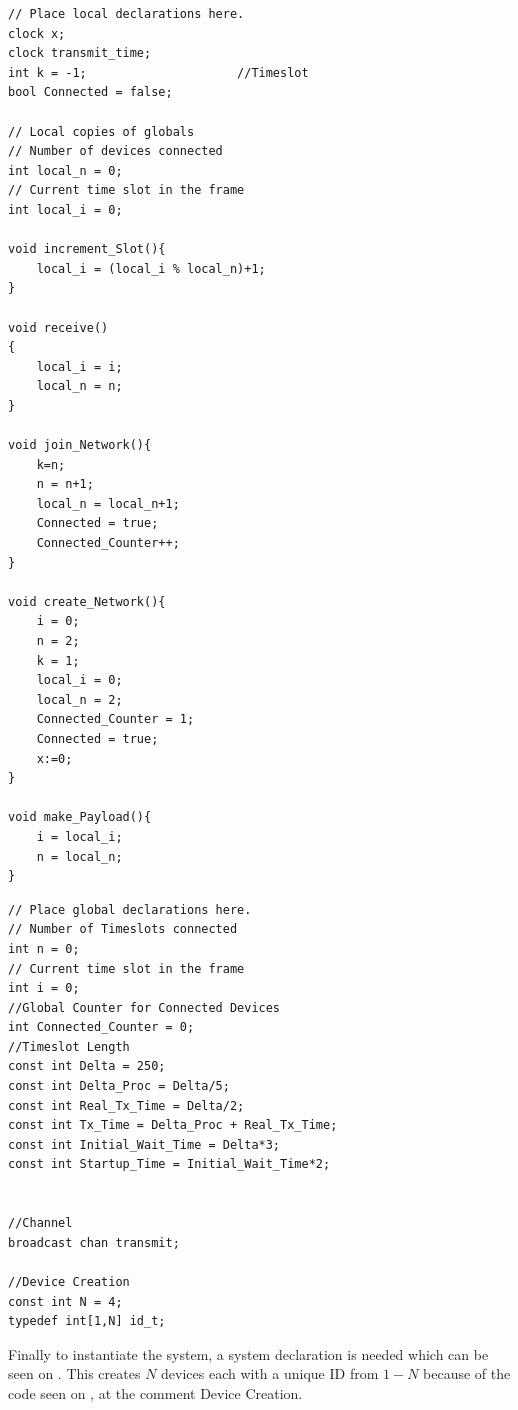 \noindent\begin{minipage}{0.47\textwidth}
\begin{lstlisting}[style=UPPAAL,
caption={Local code for Device.}, label={device_local}]
// Place local declarations here.
clock x;
clock transmit_time;
int k = -1;                     //Timeslot
bool Connected = false;

// Local copies of globals
// Number of devices connected
int local_n = 0; 
// Current time slot in the frame
int local_i = 0;

void increment_Slot(){
    local_i = (local_i % local_n)+1;
}

void receive()
{
    local_i = i;
    local_n = n;
}

void join_Network(){
    k=n;
    n = n+1;
    local_n = local_n+1;
    Connected = true;
    Connected_Counter++;
}

void create_Network(){
    i = 0;
    n = 2;
    k = 1;
    local_i = 0;
    local_n = 2;
    Connected_Counter = 1;
    Connected = true;
    x:=0;
}

void make_Payload(){
    i = local_i;
    n = local_n;
}

\end{lstlisting}
\end{minipage}\hfill
\begin{minipage}{0.47\textwidth}
\begin{lstlisting}[style=UPPAAL,
caption={Code for the global declarations.}, label={uppaal_Global}]
// Place global declarations here.
// Number of Timeslots connected
int n = 0;         
// Current time slot in the frame
int i = 0;            
//Global Counter for Connected Devices                    
int Connected_Counter = 0;
//Timeslot Length
const int Delta = 250;                 
const int Delta_Proc = Delta/5;
const int Real_Tx_Time = Delta/2;
const int Tx_Time = Delta_Proc + Real_Tx_Time;
const int Initial_Wait_Time = Delta*3;
const int Startup_Time = Initial_Wait_Time*2;


//Channel
broadcast chan transmit;

//Device Creation
const int N = 4;
typedef int[1,N] id_t;
\end{lstlisting}
\end{minipage}

Finally to instantiate the system, a system declaration is needed which can be seen on .
This creates $N$ devices each with a unique ID from $1 - N$ because of the code seen on , at the comment Device Creation.

